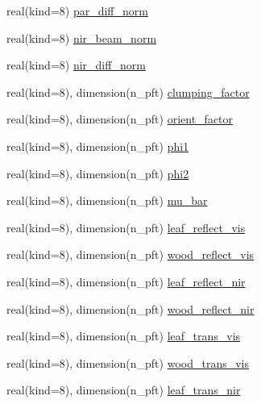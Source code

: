 \begin{DoxyCompactItemize}
\item 
real(kind=8) \hyperlink{namespacecanopy__radiation__coms_ab53bf5914c4dc3aa86dd2160e68069ba}{par\+\_\+diff\+\_\+norm}
\item 
real(kind=8) \hyperlink{namespacecanopy__radiation__coms_a9387757f090749999584c88841b2d58d}{nir\+\_\+beam\+\_\+norm}
\item 
real(kind=8) \hyperlink{namespacecanopy__radiation__coms_a0f8a87e695122729f76ac2044ee7dec7}{nir\+\_\+diff\+\_\+norm}
\item 
real(kind=8), dimension(n\+\_\+pft) \hyperlink{namespacecanopy__radiation__coms_a2fa961375137b621f360e2de7d57a2a9}{clumping\+\_\+factor}
\item 
real(kind=8), dimension(n\+\_\+pft) \hyperlink{namespacecanopy__radiation__coms_a15026d6621180461dc537b2a9ea8e012}{orient\+\_\+factor}
\item 
real(kind=8), dimension(n\+\_\+pft) \hyperlink{namespacecanopy__radiation__coms_a03002619fd623b8e11ded7e257d4579f}{phi1}
\item 
real(kind=8), dimension(n\+\_\+pft) \hyperlink{namespacecanopy__radiation__coms_a84f81efa08280199991186a9f501c053}{phi2}
\item 
real(kind=8), dimension(n\+\_\+pft) \hyperlink{namespacecanopy__radiation__coms_ad267188bb42ff06c3f69554fbe4c595e}{mu\+\_\+bar}
\item 
real(kind=8), dimension(n\+\_\+pft) \hyperlink{namespacecanopy__radiation__coms_a155b16acb09a1de77430d943c332d850}{leaf\+\_\+reflect\+\_\+vis}
\item 
real(kind=8), dimension(n\+\_\+pft) \hyperlink{namespacecanopy__radiation__coms_ae24039da794ebfb5ff7eb9db190a9a1e}{wood\+\_\+reflect\+\_\+vis}
\item 
real(kind=8), dimension(n\+\_\+pft) \hyperlink{namespacecanopy__radiation__coms_a4e4cdd2fcb0cf93d9c9521bde9362a30}{leaf\+\_\+reflect\+\_\+nir}
\item 
real(kind=8), dimension(n\+\_\+pft) \hyperlink{namespacecanopy__radiation__coms_af020f9ae454b2719750aca108226147e}{wood\+\_\+reflect\+\_\+nir}
\item 
real(kind=8), dimension(n\+\_\+pft) \hyperlink{namespacecanopy__radiation__coms_ab5495eba323c2fab375464eddc773362}{leaf\+\_\+trans\+\_\+vis}
\item 
real(kind=8), dimension(n\+\_\+pft) \hyperlink{namespacecanopy__radiation__coms_add3e4a271e770993c7867304bd138bf2}{wood\+\_\+trans\+\_\+vis}
\item 
real(kind=8), dimension(n\+\_\+pft) \hyperlink{namespacecanopy__radiation__coms_a83636a1072454a72163dea005f6695bf}{leaf\+\_\+trans\+\_\+nir}

\end{DoxyCompactItemize}
